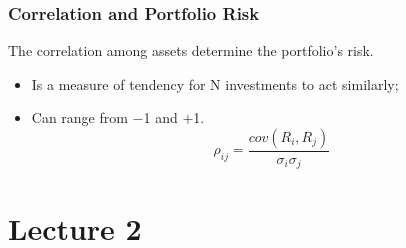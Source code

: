 \documentclass[11pt,a4paper]{report}
\begin{document}
\subsection{Correlation and Portfolio Risk}
The correlation among assets determine the portfolio's risk.
\begin{itemize}
    \item Is a measure of tendency for N investments to act similarly;
    \item Can range from $-$1 and $+$1.
    \[\rho_{ij} = \frac{cov(R_i,R_j)}{\sigma_i \sigma_j}\]
\end{itemize}

\chapter{Lecture 2}
\end{document}
